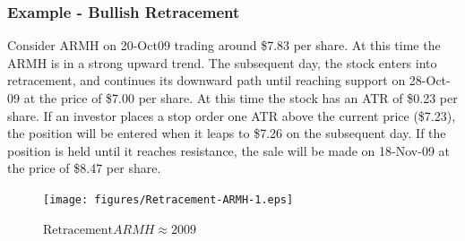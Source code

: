 \subsubsection{Example - Bullish Retracement}
%
Consider ARMH on 20-Oct09 trading around \$7.83 per share.  At this time the ARMH is in a strong upward trend.  The subsequent day, the stock enters into retracement, and continues its downward path until reaching support on 28-Oct-09 at the price of \$7.00 per share.  At this time the stock has an ATR of \$0.23 per share.  If an investor places a stop order one ATR above the current price (\$7.23), the position will be entered when it leaps to \$7.26 on the subsequent day.  If the position is held until it reaches resistance, the sale will be made on 18-Nov-09 at the price of \$8.47 per share.
\begin{center}
\end{center}
%
\begin{figure}[ht]\centering
\label{fig:retracement}
\texttt{[image: figures/Retracement-ARMH-1.eps]}
\caption{$\mbox{Retracement} ARMH \approx 2009$}
\end{figure}



